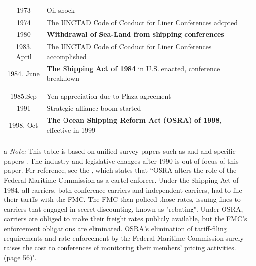\documentclass[11pt]{article}
\begin{document}
\begin{table}[ht!]
\begin{tabular}{cll}
      1973 & Oil shock &\\
      1974 & The UNCTAD Code of Conduct for Liner Conferences adopted &\cite{fox1992empirical,fox1995some}\\
      1980 & \textbf{Withdrawal of Sea-Land from shipping conferences}&\cite{sjostrom1989collusion}\\
      1983. April&The UNCTAD Code of Conduct for Liner Conferences accomplished &\\
      1984. June & \textbf{The Shipping Act of 1984} in U.S. enacted, conference breakdown &\cite{clyde1995effectiveness,clyde1998market}\\
      & &\cite{wilson1991some}\\
      & &\cite{pirrong1992application}\\
      1985.Sep&Yen appreciation due to Plaza agreement&\\\hline
      1991 & Strategic alliance boom started &\\
      1998. Oct  & \textbf{The Ocean Shipping Reform Act (OSRA) of 1998}, effective in 1999 &\cite{reitzes2002rolling}\\
      &&\cite{fusillo2006some,fusillo2013stability}\\\hline
    \end{tabular}
    \begin{tablenotes}
\item[a]\textit{Note:} This table is based on unified survey papers such as \cite{sjostrom2004ocean,sjostrom2013competition} and \cite{martin2012market} and specific papers \citep{clyde1995effectiveness,clyde1998market}. The industry and legislative changes after 1990 is out of focus of this paper. For reference, see the \cite{reitzes2002rolling}, which states that ``OSRA alters the role of the Federal Maritime Commission as a cartel enforcer. Under the Shipping Act of 1984, all carriers, both conference carriers and independent carriers, had to file their tariffs with the FMC. The FMC then policed those rates, issuing fines to carriers that engaged in secret discounting, known as "rebating". Under OSRA, carriers are obliged to make their freight rates publicly available, but the FMC's enforcement obligations are eliminated. OSRA's elimination of tariff-filing requirements and rate enforcement by the Federal Maritime Commission surely raises the cost to conferences of monitoring their members' pricing activities. (page 56)".
   \end{tablenotes}
\end{table}
\end{document}

